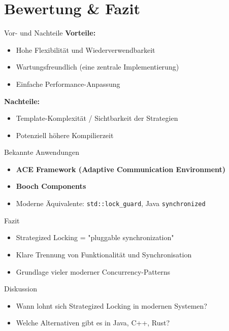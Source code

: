 \documentclass[aspectratio=169,10pt]{beamer}
\begin{document}
\section{Bewertung \& Fazit}
\begin{frame}{Vor- und Nachteile}
  \textbf{Vorteile:}
  \begin{itemize}
    \item Hohe Flexibilität und Wiederverwendbarkeit
    \item Wartungsfreundlich (eine zentrale Implementierung)
    \item Einfache Performance-Anpassung
  \end{itemize}

  \vspace{1em}
  \textbf{Nachteile:}
  \begin{itemize}
    \item Template-Komplexität / Sichtbarkeit der Strategien
    \item Potenziell höhere Kompilierzeit
  \end{itemize}
\end{frame}

\begin{frame}{Bekannte Anwendungen}
  \begin{itemize}
    \item \textbf{ACE Framework (Adaptive Communication Environment)}
    \item \textbf{Booch Components}
    \item Moderne Äquivalente: \texttt{std::lock\_guard}, Java \texttt{synchronized}
  \end{itemize}
\end{frame}

\begin{frame}{Fazit}
  \begin{itemize}
    \item Strategized Locking = "pluggable synchronization"
    \item Klare Trennung von Funktionalität und Synchronisation
    \item Grundlage vieler moderner Concurrency-Patterns
  \end{itemize}
\end{frame}

\begin{frame}{Diskussion}
  \begin{itemize}
    \item Wann lohnt sich Strategized Locking in modernen Systemen?
    \item Welche Alternativen gibt es in Java, C++, Rust?
  \end{itemize}
\end{frame}
\end{document}
